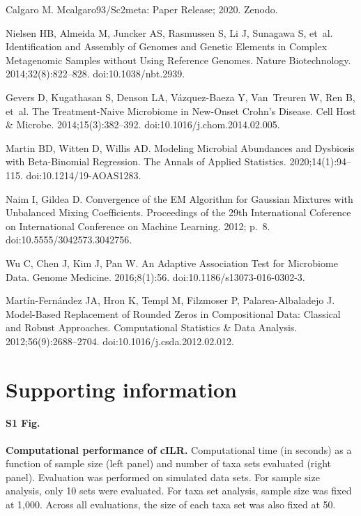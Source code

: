 \documentclass[10pt,letterpaper]{article}
\begin{document}
\begin{thebibliography}{10}
Calgaro M. Mcalgaro93/Sc2meta: {{Paper Release}}; 2020.
\newblock Zenodo.

Nielsen HB, Almeida M, Juncker AS, Rasmussen S, Li J, Sunagawa S, et~al.
\newblock Identification and Assembly of Genomes and Genetic Elements in
  Complex Metagenomic Samples without Using Reference Genomes.
\newblock Nature Biotechnology. 2014;32(8):822--828.
\newblock doi:{10.1038/nbt.2939}.

Gevers D, Kugathasan S, Denson LA, {V{\'a}zquez-Baeza} Y, Van~Treuren W, Ren B,
  et~al.
\newblock The {{Treatment}}-{{Naive Microbiome}} in {{New}}-{{Onset Crohn}}'s
  {{Disease}}.
\newblock Cell Host \& Microbe. 2014;15(3):382--392.
\newblock doi:{10.1016/j.chom.2014.02.005}.

Martin BD, Witten D, Willis AD.
\newblock Modeling Microbial Abundances and Dysbiosis with Beta-Binomial
  Regression.
\newblock The Annals of Applied Statistics. 2020;14(1):94--115.
\newblock doi:{10.1214/19-AOAS1283}.

Naim I, Gildea D.
\newblock Convergence of the {{EM Algorithm}} for {{Gaussian Mixtures}} with
  {{Unbalanced Mixing Coefficients}}.
\newblock Proceedings of the 29th International Coference on International
  Conference on Machine Learning. 2012; p.~8.
\newblock doi:{10.5555/3042573.3042756}.

Wu C, Chen J, Kim J, Pan W.
\newblock An Adaptive Association Test for Microbiome Data.
\newblock Genome Medicine. 2016;8(1):56.
\newblock doi:{10.1186/s13073-016-0302-3}.

{Mart{\'i}n-Fern{\'a}ndez} JA, Hron K, Templ M, Filzmoser P,
  {Palarea-Albaladejo} J.
\newblock Model-Based Replacement of Rounded Zeros in Compositional Data:
  {{Classical}} and Robust Approaches.
\newblock Computational Statistics \& Data Analysis. 2012;56(9):2688--2704.
\newblock doi:{10.1016/j.csda.2012.02.012}.

\end{thebibliography}

\section*{Supporting information}

\paragraph*{S1 Fig.}
\label{S1_Fig}
{\bf Computational performance of cILR.} Computational time (in seconds) as a function of sample size (left panel) and number of taxa sets evaluated (right panel). Evaluation was performed on simulated data sets. For sample size analysis, only 10 sets were evaluated. For taxa set analysis, sample size was fixed at 1,000. Across all evaluations, the size of each taxa set was also fixed at 50. 
\end{document}
